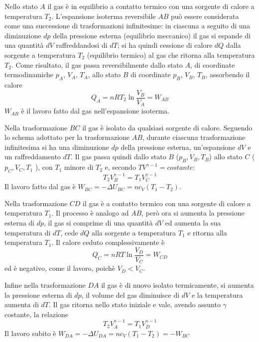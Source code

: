 \documentclass[class=book, crop=false, oneside, 12pt]{standalone}
\begin{document}
Nello stato \(A\) il gas è in equilibrio a contatto termico con una sorgente di calore a temperatura \(T_2\).
L'espansione isoterma reversibile \(AB\) può essere considerata come una successione di trasformazioni infinitesime: in ciascuna a seguito di una diminuzione \(dp\) della pressione esterna (equilibrio meccanico) il gas si espande di una quantità \(d V\) raffreddandosi di \(d T\); si ha quindi cessione di calore \(d Q\) dalla sorgente a temperatura \(T_2\) (equilibrio termico) al gas che ritorna alla temperatura \(T_2\). 
Come risultato, il gas passa reversibilmente dallo stato \(A\), di coordinate termodinamiche \(p_A\), \(V_A\), \(T_A\), allo stato \(B\) di coordinate \(p_B\), \(V_B\), \(T_B\), assorbendo il calore
\begin{equation*}
    Q_A = n R T_2 \ln \frac{V_B}{V_A} = W_{AB}
\end{equation*}
\(W_{AB}\) è il lavoro fatto dal gas nell'espansione isoterma. 

Nella trasformazione \(B C\) il gas è isolato da qualsiasi sorgente di calore. 
Seguendo lo schema adottato per la trasformazione \(AB\), durante ciascuna trasformazione infinitesima si ha una diminuzione \(d p\) della pressione esterna, un'espansione \(d V\) e un raffreddamento \(d T\). 
Il gas passa quindi dallo stato \(B\) (\(p_B, V_B, T_B\)) allo stato \(C\) ( \(p_C, V_C, T_1\) ), con \(T_1\) minore di \(T_2\) e, secondo \(TV^{\gamma-1} = costante\):
\begin{equation*}
    T_2 V_B^{\gamma - 1} = T_1 V_C^{\gamma-1}
\end{equation*}
Il lavoro fatto dal gas è \(W_{BC} = -\Delta U_{BC} = n c_V \left(T_1 - T_2\right)\).

Nella trasformazione \(C D\) il gas è a contatto termico con una sorgente di calore a temperatura \(T_1\). 
Il processo è analogo ad \(A B\), però ora si aumenta la pressione esterna di \(d p\), il gas si comprime di una quantità \(d V\) ed aumenta la sua temperatura di \(d T\), cede \(d Q\) alla sorgente a temperatura \(T_1\) e ritorna alla temperatura \(T_1\). 
Il calore ceduto complessivamente è 
\begin{equation*}
    Q_C = n R T \ln \frac{V_D}{V_C} = W_{CD}
\end{equation*}
ed è negativo, come il lavoro, poichè \(V_D < V_C\).

Infine nella trasformazione \(D A\) il gas è di nuovo isolato termicamente, si aumenta la pressione esterna di \(d p\), il volume del gas diminuisce di \(d V\) e  la temperatura aumenta di \(d T\). 
Il gas ritorna nello stato iniziale e vale, avendo assunto \(\gamma\) costante, la relazione
\begin{equation*}
    T_2 V_A^{\gamma - 1} = T_1 V_D^{\gamma - 1}
\end{equation*}
Il lavoro subito è \(W_{DA} = -\Delta U_{DA} = n c_V \left(T_1 - T_2\right) = - W_{BC}\)
\end{document}
